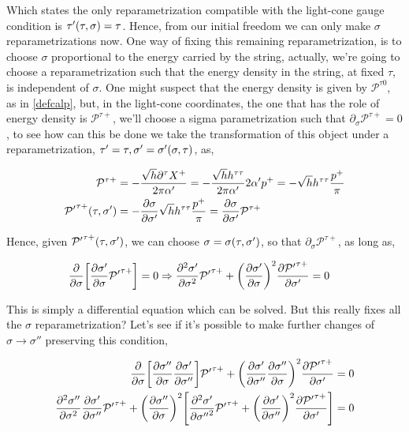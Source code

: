 Which states the only reparametrization compatible with the light-cone gauge condition is $\tau'\qty(\tau,\sigma)=\tau$. Hence, from our 
initial freedom we can only make $\sigma$ reparametrizations now. One way of fixing this remaining reparametrization, is to choose $\sigma$ proportional 
to the energy carried by the string, actually, we're going to choose a reparametrization such that the energy density in the string, at fixed $\tau$, is independent of 
$\sigma$. One might suspect that the energy density is given by $\mathcal P^{\tau0}$, as in \ref{defcalp}, but, in the light-cone coordinates, the one that has 
the role of energy density is $\mathcal P^{\tau+}$, we'll choose a sigma parametrization such that $\partial_\sigma\mathcal P^{\tau+}=0$, to see how can this 
be done we take the transformation of this object under a reparametrization, $\tau'=\tau,\sigma'=\sigma'\qty(\sigma,\tau)$, as,

\begin{align*}
    \mathcal P^{\tau+}&=-\frac{\sqrt h\partial^\tau X^+}{2\pi\alpha'}=-\frac{\sqrt h h^{\tau\tau}}{2\pi\alpha'}2\alpha'p^+=-\sqrt h h^{\tau\tau}\frac{p^+}{\pi}\\
    {\mathcal P'}^{\tau+}\qty(\tau,\sigma')&=-\pdv{\sigma}{\sigma'}\sqrt h h^{\tau\tau}\frac{p^+}{\pi}=\pdv{\sigma}{\sigma'}\mathcal P^{\tau+}
\end{align*}

Hence, given ${\mathcal P'}^{\tau+}\qty(\tau,\sigma')$, we can choose $\sigma=\sigma\qty(\tau,\sigma')$, so that $\partial_\sigma\mathcal P^{\tau+}$, as long as,

\begin{align*}
    \pdv{}{\sigma}\qty[{\pdv{\sigma'}{\sigma}}{\mathcal P'}^{\tau+}]&=0\Rightarrow{\pdv[2]{\sigma'}{\sigma}}{\mathcal P'}^{\tau+}+\qty(\pdv{\sigma'}{\sigma})^2\pdv{{\mathcal P'}^{\tau+}}{\sigma'}=0
\end{align*}

This is simply a differential equation which can be solved. But this really fixes all the $\sigma$ reparametrization? Let's see if it's possible to 
make further changes of $\sigma\rightarrow \sigma''$ preserving this condition,

\begin{align*}
    {\pdv{}{\sigma}}\qty[{\pdv{\sigma''}{\sigma}}{\pdv{\sigma'}{\sigma''}}]{\mathcal P'}^{\tau+}+\qty(\pdv{\sigma'}{\sigma''}\pdv{\sigma''}{\sigma})^2\pdv{{\mathcal P'}^{\tau+}}{\sigma'}&=0\\
    {\pdv[2]{\sigma''}{\sigma}}{\pdv{\sigma'}{\sigma''}}{\mathcal P'}^{\tau+}+\qty(\pdv{\sigma''}{\sigma})^2\qty[{\pdv[2]{{\sigma'}}{{\sigma''}}}{\mathcal P'}^{\tau+}
    +\qty(\pdv{\sigma'}{\sigma''})^2\pdv{{\mathcal P'}^{\tau+}}{\sigma'}
    ]&=0
\end{align*}

